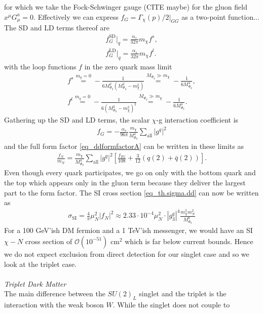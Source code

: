 for which we take the Fock-Schwinger gauge (CITE maybe) for the gluon
field $x^\mu G^a_\mu = 0$. Effectively we can express $f_G = \Gamma_\chi(p)/2|_{GG}$ as a two-point function... The SD and LD terms thereof are
\begin{align}
 f_G^\text{SD}|_q = \frac{\alpha_s}{32\pi} m_\chi f^s,\\
 f_G^\text{LD}|_q = \frac{\alpha_s}{32\pi} m_\chi f^l.
\end{align}
with the loop functions $f$ in the zero quark mass limit
\begin{align}
 f^s \stackrel{m_q=0}{=} - \frac{1}{6M_{\Phi_q}^2\left(M_{\Phi_q}^2-m_\chi^2\right)} \stackrel{M_{\Phi_q}\gg m_\chi}{=} -\frac{1}{6M_{\Phi_q}^4},\\
 f^l \stackrel{m_q=0}{=} - \frac{1}{6\left(M_{\Phi_q}^2-m_\chi^2\right)^2}  \stackrel{M_{\Phi_q}\gg m_\chi}{=} -\frac{1}{6M_{\Phi_q}^4}.
\end{align}
Gathering up the SD and LD terms, the scalar $\chi$-g interaction coefficient is
\begin{align}
 f_G = -\frac{\alpha_s}{96\pi} \frac{m_\chi}{M_{\Phi_q}^4} \sum\limits_{\text{all}} |g^q|^2
\end{align}
and the full form factor \eqref{eq_ddformfactorA} can be written in these limits as
\begin{align}
 \frac{f_N}{m_N} = \frac{m_\chi}{M_{\Phi_q}^4} \sum\limits_\text{all} \left|g^q\right|^2 \left[\frac{f_{TG}}{108} + \frac{3}{12}\left(q(2) + \bar q(2)\right)\right].
\end{align}
Even though every quark participates, we go on only with the bottom quark and the top which appears only in the gluon term because they deliver the
largest part to the form factor. The SI cross section \eqref{eq_th.sigma.dd} can now be written as
\begin{align}
 \sigma_\text{SI} = \frac{4}{\pi}\mu_N^2 \left| f_N \right| ^2 \approx 2.33\cdot 10^{-4} \mu_N^2 \cdot |g^q_3|^4 \frac{m_\chi^2 m_N^2}{M_{\Phi_q}^8}
 \label{eq_sigmaDDA}
\end{align}
For a 100 GeV'ish DM fermion and a 1 TeV'ish messenger, we would have an SI $\chi-N$ cross section of $\mathcal{O}(10^{-51})$ cm$^2$ which is far 
below current bounds. Hence we do not expect exclusion from direct detection for our singlet case and so we look at the triplet case.
\\ \\ \textit{Triplet Dark Matter}\\
The main difference between the $SU(2)_L$ singlet and the triplet is the interaction with the weak boson $W$. While the singlet does not couple to
